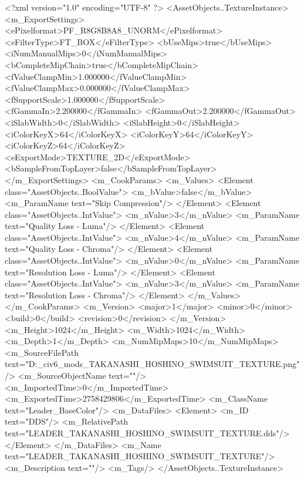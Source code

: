 <?xml version="1.0" encoding="UTF-8" ?>
<AssetObjects..TextureInstance>
	<m_ExportSettings>
		<ePixelformat>PF_R8G8B8A8_UNORM</ePixelformat>
		<eFilterType>FT_BOX</eFilterType>
		<bUseMips>true</bUseMips>
		<iNumManualMips>0</iNumManualMips>
		<bCompleteMipChain>true</bCompleteMipChain>
		<fValueClampMin>1.000000</fValueClampMin>
		<fValueClampMax>0.000000</fValueClampMax>
		<fSupportScale>1.000000</fSupportScale>
		<fGammaIn>2.200000</fGammaIn>
		<fGammaOut>2.200000</fGammaOut>
		<iSlabWidth>0</iSlabWidth>
		<iSlabHeight>0</iSlabHeight>
		<iColorKeyX>64</iColorKeyX>
		<iColorKeyY>64</iColorKeyY>
		<iColorKeyZ>64</iColorKeyZ>
		<eExportMode>TEXTURE_2D</eExportMode>
		<bSampleFromTopLayer>false</bSampleFromTopLayer>
	</m_ExportSettings>
	<m_CookParams>
		<m_Values>
			<Element class="AssetObjects..BoolValue">
				<m_bValue>false</m_bValue>
				<m_ParamName text="Skip Compression"/>
			</Element>
			<Element class="AssetObjects..IntValue">
				<m_nValue>3</m_nValue>
				<m_ParamName text="Quality Loss - Luma"/>
			</Element>
			<Element class="AssetObjects..IntValue">
				<m_nValue>4</m_nValue>
				<m_ParamName text="Quality Loss - Chroma"/>
			</Element>
			<Element class="AssetObjects..IntValue">
				<m_nValue>0</m_nValue>
				<m_ParamName text="Resolution Loss - Luma"/>
			</Element>
			<Element class="AssetObjects..IntValue">
				<m_nValue>3</m_nValue>
				<m_ParamName text="Resolution Loss - Chroma"/>
			</Element>
		</m_Values>
	</m_CookParams>
	<m_Version>
		<major>1</major>
		<minor>0</minor>
		<build>0</build>
		<revision>0</revision>
	</m_Version>
	<m_Height>1024</m_Height>
	<m_Width>1024</m_Width>
	<m_Depth>1</m_Depth>
	<m_NumMipMaps>10</m_NumMipMaps>
	<m_SourceFilePath text="D:\Documents\GitHub\Uzuki_civ6_mods\BankHeisters\LEADER_TAKANASHI_HOSHINO_SWIMSUIT_TEXTURE.png"/>
	<m_SourceObjectName text=""/>
	<m_ImportedTime>0</m_ImportedTime>
	<m_ExportedTime>2758429806</m_ExportedTime>
	<m_ClassName text="Leader_BaseColor"/>
	<m_DataFiles>
		<Element>
			<m_ID text="DDS"/>
			<m_RelativePath text="LEADER_TAKANASHI_HOSHINO_SWIMSUIT_TEXTURE.dds"/>
		</Element>
	</m_DataFiles>
	<m_Name text="LEADER_TAKANASHI_HOSHINO_SWIMSUIT_TEXTURE"/>
	<m_Description text=""/>
	<m_Tags/>
</AssetObjects..TextureInstance>

